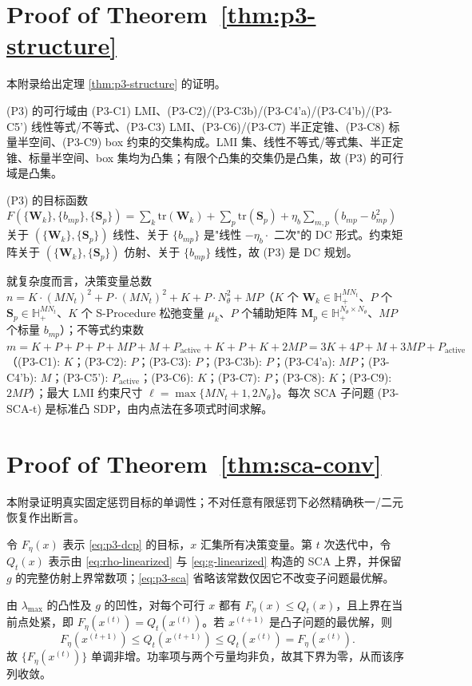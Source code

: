 \documentclass[12pt,a4paper]{article}
\newcommand{\mat}[1]{\mathbf{#1}}
\newcommand{\tr}{\text{tr}}
\begin{document}
\appendix
\section{Proof of Theorem~\ref{thm:p3-structure}}\label{app:proof-p3}

本附录给出定理 \ref{thm:p3-structure} 的证明。

(P3) 的可行域由 (P3-C1) LMI、(P3-C2)/(P3-C3b)/(P3-C4'a)/(P3-C4'b)/(P3-C5') 线性等式/不等式、(P3-C3) LMI、(P3-C6)/(P3-C7) 半正定锥、(P3-C8) 标量半空间、(P3-C9) box 约束的交集构成。LMI 集、线性不等式/等式集、半正定锥、标量半空间、box 集均为凸集；有限个凸集的交集仍是凸集，故 (P3) 的可行域是凸集。

(P3) 的目标函数 $F(\{\mat{W}_k\}, \{b_{mp}\}, \{\mat{S}_p\}) = \sum_k \tr(\mat{W}_k) + \sum_p \tr(\mat{S}_p) + \eta_b \sum_{m,p} (b_{mp} - b_{mp}^2)$ 关于 $(\{\mat{W}_k\}, \{\mat{S}_p\})$ 线性、关于 $\{b_{mp}\}$ 是"线性 $- \eta_b \cdot$ 二次"的 DC 形式。约束矩阵关于 $(\{\mat{W}_k\}, \{\mat{S}_p\})$ 仿射、关于 $\{b_{mp}\}$ 线性，故 (P3) 是 DC 规划。

就复杂度而言，决策变量总数 $n = K \cdot (MN_t)^2 + P \cdot (MN_t)^2 + K + P \cdot N_\theta^2 + MP$（$K$ 个 $\mat{W}_k \in \mathbb{H}_+^{MN_t}$、$P$ 个 $\mat{S}_p \in \mathbb{H}_+^{MN_t}$、$K$ 个 S-Procedure 松弛变量 $\mu_k$、$P$ 个辅助矩阵 $\mat{M}_p \in \mathbb{H}_+^{N_\theta \times N_\theta}$、$MP$ 个标量 $b_{mp}$）；不等式约束数 $m = K + P + P + P + MP + M + P_{\text{active}} + K + P + K + 2MP = 3K + 4P + M + 3MP + P_{\text{active}}$（(P3-C1): $K$；(P3-C2): $P$；(P3-C3): $P$；(P3-C3b): $P$；(P3-C4'a): $MP$；(P3-C4'b): $M$；(P3-C5'): $P_{\text{active}}$；(P3-C6): $K$；(P3-C7): $P$；(P3-C8): $K$；(P3-C9): $2MP$）；最大 LMI 约束尺寸 $\ell = \max\{MN_t + 1, 2 N_\theta\}$。每次 SCA 子问题 (P3-SCA-t) 是标准凸 SDP，由内点法在多项式时间求解。

\section{Proof of Theorem~\ref{thm:sca-conv}}\label{app:proof-sca-conv}

本附录证明真实固定惩罚目标的单调性；不对任意有限惩罚下必然精确秩一/二元恢复作出断言。

令 $F_\eta(x)$ 表示 \eqref{eq:p3-dcp} 的目标，$x$ 汇集所有决策变量。第 $t$ 次迭代中，令 $Q_t(x)$ 表示由 \eqref{eq:rho-linearized} 与 \eqref{eq:g-linearized} 构造的 SCA 上界，并保留 $g$ 的完整仿射上界常数项；\eqref{eq:p3-sca} 省略该常数仅因它不改变子问题最优解。

由 $\lambda_{\max}$ 的凸性及 $g$ 的凹性，对每个可行 $x$ 都有 $F_\eta(x)\leq Q_t(x)$，且上界在当前点处紧，即 $F_\eta(x^{(t)})=Q_t(x^{(t)})$。若 $x^{(t+1)}$ 是凸子问题的最优解，则
\[
 F_\eta(x^{(t+1)})\leq Q_t(x^{(t+1)})\leq Q_t(x^{(t)})=F_\eta(x^{(t)}).
\]
故 $\{F_\eta(x^{(t)})\}$ 单调非增。功率项与两个亏量均非负，故其下界为零，从而该序列收敛。
\end{document}
